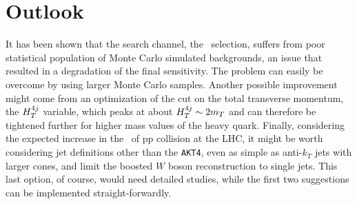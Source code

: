 \section{Outlook}\label{sec:wbxOUT}

It has been shown that the search channel, the \tight\ selection,
suffers from poor statistical population of Monte Carlo simulated
backgrounds, an issue that resulted in a degradation
of the final sensitivity. The problem can easily be overcome by
using larger Monte Carlo samples. Another possible improvement
might come from an optimization of the cut on the total transverse
momentum, the $\htfj$ variable, which peaks at about $\htfj\sim 2m_T$
and can therefore be tightened further for higher mass values of the
heavy quark. Finally, considering the expected increase in the
\cme\ of pp collision at the LHC, it might be worth considering 
jet definitions other than the \texttt{AKT4}, even as simple as
anti-$k_T$ jets with larger cones, and limit the boosted $W$
boson reconstruction to single jets. This last option, of course,
would need detailed studies, while the first two suggestions
can be implemented straight-forwardly.
